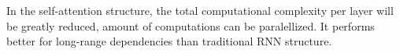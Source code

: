 In the self-attention structure, the total computational complexity per layer will be greatly reduced, amount of computations can be paralellized. It performs better for long-range dependencies than traditional RNN structure.


%
%





